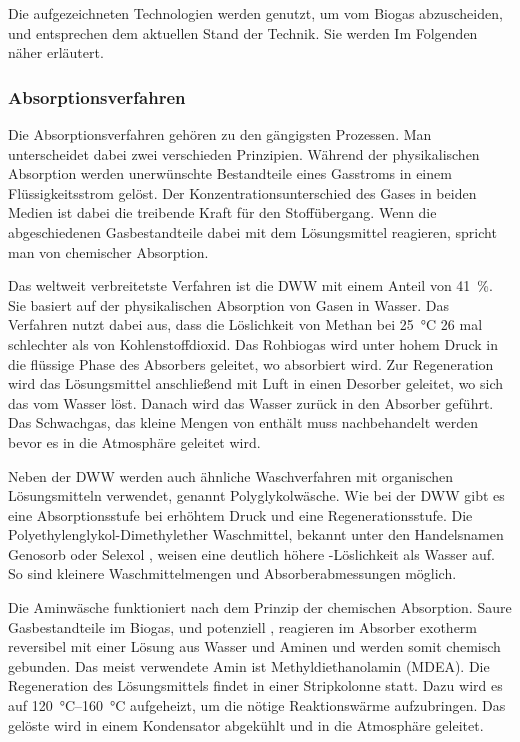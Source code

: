 


Die aufgezeichneten Technologien werden genutzt, um  vom Biogas abzuscheiden, und entsprechen dem aktuellen Stand der Technik. Sie werden Im Folgenden näher erläutert. 


\subsubsection{Absorptionsverfahren}\label{chap:absorp}

Die Absorptionsverfahren gehören zu den gängigsten Prozessen. Man unterscheidet dabei zwei verschieden Prinzipien. Während der physikalischen Absorption werden unerwünschte Bestandteile eines Gasstroms in einem Flüssigkeitsstrom gelöst. Der Konzentrationsunterschied des Gases in beiden Medien ist dabei die treibende Kraft für den Stoffübergang. Wenn die abgeschiedenen Gasbestandteile dabei mit dem Lösungsmittel reagieren, spricht man von chemischer Absorption. \parencite{Rasi09} \smallskip

Das weltweit verbreitetste Verfahren ist die \gls{DWW} mit einem Anteil von \SI{41}{\percent}. Sie basiert auf der physikalischen Absorption von Gasen in Wasser. Das Verfahren nutzt dabei aus, dass die Löslichkeit von Methan bei \SI{25}{\degreeCelsius} \SI{26}{\relax} mal schlechter als von Kohlenstoffdioxid. Das Rohbiogas wird unter hohem Druck in die flüssige Phase des Absorbers geleitet, wo  absorbiert wird. Zur Regeneration wird das Lösungsmittel anschließend mit Luft in einen Desorber geleitet, wo sich das  vom Wasser löst. Danach wird das Wasser zurück in den Absorber geführt. Das Schwachgas, das kleine Mengen von  enthält muss nachbehandelt werden bevor es in die Atmosphäre geleitet wird.  \parencite{KGKK2019} \parencite{BHPT13} \smallskip

Neben der \gls{DWW} werden auch ähnliche Waschverfahren mit organischen Lösungsmitteln verwendet, genannt Polyglykolwäsche. Wie bei der \gls{DWW} gibt es eine Absorptionsstufe bei erhöhtem Druck und eine Regenerationsstufe. Die Polyethylenglykol-Dimethylether Waschmittel, bekannt unter den Handelsnamen Genosorb \textsuperscript{\textregistered} oder Selexol \textsuperscript{\textregistered}, weisen eine deutlich höhere -Löslichkeit als Wasser auf. So sind kleinere Waschmittelmengen und Absorberabmessungen möglich. \parencite{FNR14} \smallskip

Die Aminwäsche funktioniert nach dem Prinzip der chemischen Absorption. Saure Gasbestandteile im Biogas,  und potenziell , reagieren im Absorber exotherm reversibel mit einer Lösung aus Wasser und Aminen und werden somit chemisch gebunden. Das meist verwendete Amin ist Methyldiethanolamin (MDEA). Die Regeneration des Lösungsmittels findet in einer Stripkolonne statt. Dazu wird es auf \SIrange{120}{160}{\degreeCelsius} aufgeheizt, um die nötige Reaktionswärme aufzubringen. Das gelöste  wird in einem Kondensator abgekühlt und in die Atmosphäre geleitet. \parencite{BHPT13} \parencite{KGKK2019}


